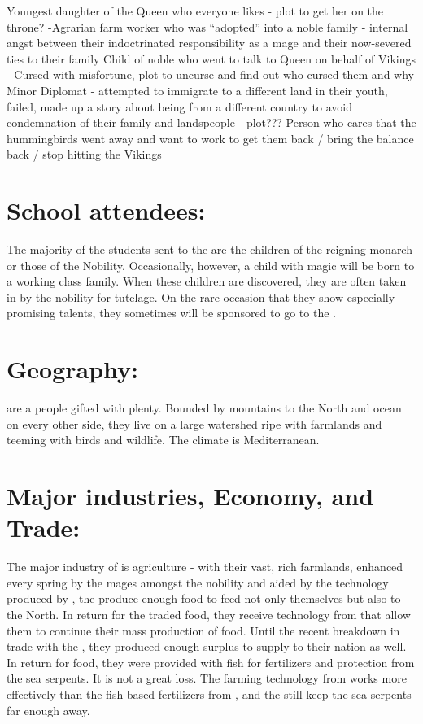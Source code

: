 \documentclass[blue]{GL2020}
\begin{document}
Youngest daughter of the Queen who everyone likes - plot to get her on the throne?
-Agrarian farm worker who was "`adopted"' into a noble family - internal angst between their indoctrinated responsibility as a mage and their now-severed ties to their family
Child of noble who went to talk to Queen on behalf of Vikings - Cursed with misfortune, plot to uncurse and find out who cursed them and why
Minor Diplomat - attempted to immigrate to a different land in their youth, failed, made up a story about being from a different country to avoid condemnation of their family and landspeople - plot???  
Person who cares that the hummingbirds went away and want to work to get them back / bring the balance back / stop hitting the Vikings

\section*{School attendees:}

The majority of the students sent to the \pSchool{} are the children of the reigning monarch or those of the Nobility. Occasionally, however, a child with magic will be born to a working class family.  When these children are discovered, they are often taken in by the nobility for tutelage.  On the rare occasion that they show especially promising talents, they sometimes will be sponsored to go to the \pSchool{}.

\section*{Geography:}

\pFarmers{} are a people gifted with plenty.  Bounded by mountains to the North and ocean on every other side, they live on a large watershed ripe with farmlands and teeming with birds and wildlife.  The climate is Mediterranean.

\section*{Major industries, Economy, and Trade:}

The major industry of \pFarm{} is agriculture - with their vast, rich farmlands, enhanced every spring by the mages amongst the nobility and aided by the technology produced by \pTech{}, the \pFarmers{} produce enough food to feed not only themselves but also \pTech{} to the North.  In return for the traded food, they receive technology from \pTech{} that allow them to continue their mass production of food.  Until the recent breakdown in trade with the \pShippies{}, they produced enough surplus to supply to their nation as well.  In return for food, they were provided with fish for fertilizers and protection from the sea serpents.  It is not a great loss.  The farming technology from \pTech{} works more effectively than the fish-based fertilizers from \pShip{}, and the \pShippies{} still keep the sea serpents far enough away.
\end{document}
